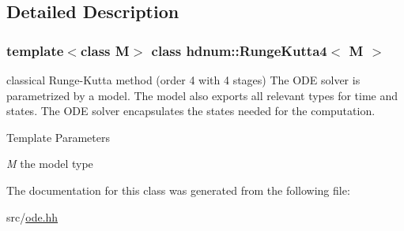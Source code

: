 \subsection{Detailed Description}
\subsubsection*{template$<$class M$>$ class hdnum::RungeKutta4$<$ M $>$}

classical Runge-\/Kutta method (order 4 with 4 stages) The ODE solver is parametrized by a model. The model also exports all relevant types for time and states. The ODE solver encapsulates the states needed for the computation.


\begin{DoxyTemplParams}{Template Parameters}
\item[{\em M}]the model type \end{DoxyTemplParams}


The documentation for this class was generated from the following file:\begin{DoxyCompactItemize}
\item 
src/\hyperlink{ode_8hh}{ode.hh}\end{DoxyCompactItemize}
